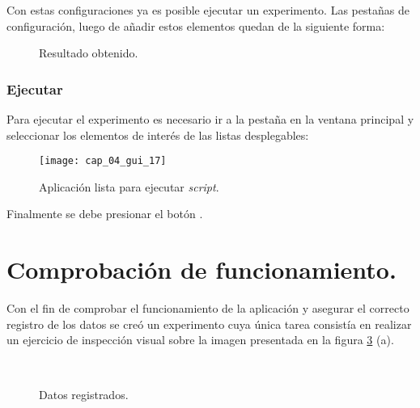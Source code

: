 \documentclass[\main/main.tex]{subfiles}
\begin{document}
                Con estas configuraciones ya es posible ejecutar un experimento. Las pestañas de configuración, luego de añadir estos elementos quedan de la siguiente forma:
                \begin{figure}[H]
                    \centering
                     \hspace{5mm}
                    \caption{Resultado obtenido.}
                    \label{fig:04_gui_final_01}
                \end{figure} 

            \subsubsection{Ejecutar}
                Para ejecutar el experimento es necesario ir a la pestaña  en la ventana principal y seleccionar los elementos de interés de las listas desplegables:
                \begin{figure}[H]
                    \centering
                    \texttt{[image: cap\_04\_gui\_17]}
                    \caption{Aplicación lista para ejecutar \textit{script}.}
                    \label{fig:04_gui_final_02}
                \end{figure} 

                Finalmente se debe presionar el botón .

    \newpage
    \section{Comprobación de funcionamiento.}
    \label{sec:04_funcionamiento}
        Con el fin de comprobar el funcionamiento de la aplicación y asegurar el correcto registro de los datos se creó un experimento cuya única tarea consistía en realizar un ejercicio de inspección visual sobre la imagen presentada en la figura \ref{fig:04_frame_result} (a). 
        \begin{figure}[H]
            \centering
            \\
            \hspace{5mm}
            \caption{Datos registrados.}
            \label{fig:04_frame_result}
        \end{figure}
\end{document}
